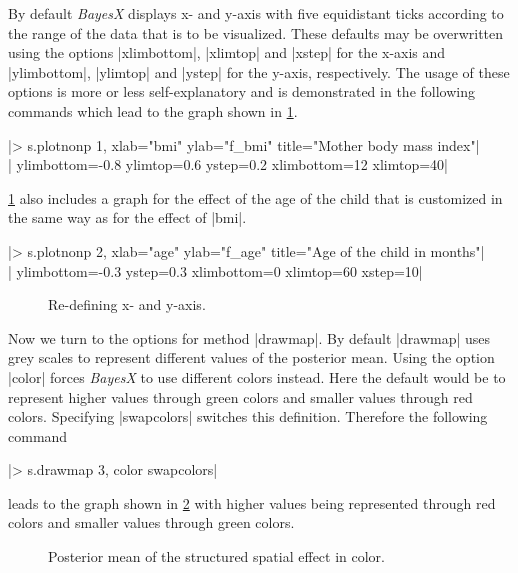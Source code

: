 By default {\it BayesX} displays x- and y-axis with five equidistant ticks according to the range of the data that is to be
visualized. These defaults may be overwritten using the options |xlimbottom|, |xlimtop| and |xstep| for the x-axis and
|ylimbottom|, |ylimtop| and |ystep| for the y-axis, respectively. The usage of these options is more or less self-explanatory
and is demonstrated in the following commands which lead to the graph shown in \ref{step:bmi6}.

|> s.plotnonp 1, xlab="bmi" ylab="f_bmi" title="Mother body mass index"|\\
|  ylimbottom=-0.8 ylimtop=0.6 ystep=0.2 xlimbottom=12 xlimtop=40|

\ref{step:bmi6} also includes a graph for the effect of the age of the child that is customized in the same way as for the
effect of |bmi|.

|> s.plotnonp 2, xlab="age" ylab="f_age" title="Age of the child in months"|\\
|  ylimbottom=-0.3  ystep=0.3 xlimbottom=0 xlimtop=60 xstep=10|

\begin{figure}[ht]
\begin{center}
{\it\caption{Re-defining x- and y-axis.\label{step:bmi6}}}
\end{center}
\end{figure}

Now we turn to the options for method |drawmap|. By default |drawmap| uses grey scales to represent different values of the
posterior mean. Using the option |color| forces {\it BayesX} to use different colors instead. Here the default would be to
represent higher values through green colors and smaller values through red colors. Specifying |swapcolors| switches this
definition. Therefore the following command

|> s.drawmap 3, color swapcolors|

leads to the graph shown in \ref{step:spat3} with higher values being represented through red colors and smaller values through
green colors.

\begin{figure}[ht]
\begin{center}
{\it\caption{Posterior mean of the structured spatial effect in
color.\label{step:spat3}}}
\end{center}
\end{figure}


